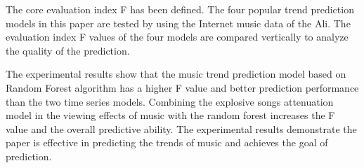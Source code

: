 \begin{eabstract}
\begin{itemize}
   \end{itemize}

   The core evaluation index F has been defined. The four popular trend prediction models in this paper are tested by using the Internet music data of the Ali. The evaluation index F values of the four models are compared vertically to analyze the quality of the prediction.

   The experimental results show that the music trend prediction model based on Random Forest algorithm has a higher F value and better prediction performance than the two time series models. Combining the explosive songs attenuation model in the viewing effects of music with the random forest increases the F value and the overall predictive ability. The experimental results demonstrate the paper is effective in predicting the trends of music and achieves the goal of prediction.
\end{eabstract}
